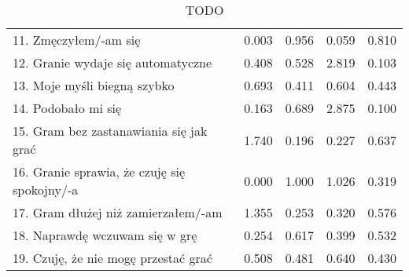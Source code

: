 \begin{table}[h!]
\begin{center}
\begin{tabular}{|m{10em}|m{5em}|m{5em}|m{5em}|m{5em}|}
            11. Zmęczyłem/-am się                                             & 0.003                       & 0.956            & 0.059                   & 0.810        \\
            12. Granie wydaje się automatyczne                                & 0.408                       & 0.528            & 2.819                   & 0.103        \\
            13. Moje myśli \newline biegną szybko                             & 0.693                       & 0.411            & 0.604                   & 0.443        \\
            14. Podobało mi się                                               & 0.163                       & 0.689            & 2.875                   & 0.100        \\
            15. Gram bez zastanawiania się jak grać                           & 1.740                       & 0.196            & 0.227                   & 0.637        \\
            16. Granie sprawia, \newline że czuję się spokojny/-a             & 0.000                       & 1.000            & 1.026                   & 0.319        \\
            17. Gram dłużej \newline niż zamierzałem/-am                      & 1.355                       & 0.253            & 0.320                   & 0.576        \\
            18. Naprawdę wczuwam się w grę                                    & 0.254                       & 0.617            & 0.399                   & 0.532        \\
            19. Czuję, że nie mogę przestać grać                              & 0.508                       & 0.481            & 0.640                   & 0.430        \\
            \hline
        \end{tabular}
    \end{center}
    \caption{TODO}\label{tab1:ch7_12}
\end{table}



